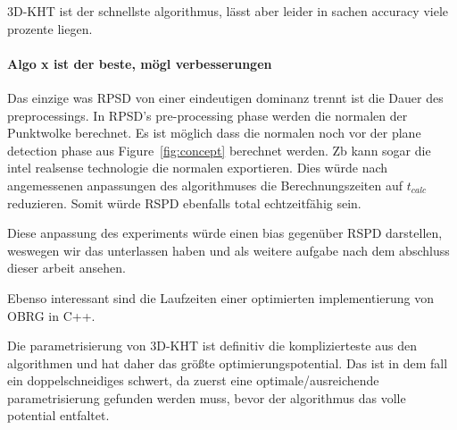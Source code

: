 \documentclass[main.tex]{subfiles}
\begin{document}
3D-KHT ist der schnellste algorithmus, lässt aber leider in sachen accuracy viele prozente liegen.

\paragraph{Algo x ist der beste, mögl verbesserungen}



Das einzige was RPSD von einer eindeutigen dominanz trennt ist die Dauer des preprocessings.
In RPSD's pre-processing phase werden die normalen der Punktwolke berechnet. 
Es ist möglich dass die normalen noch vor der plane detection phase aus Figure~\ref{fig:concept}
berechnet werden. Zb kann sogar die intel realsense technologie die normalen exportieren.
Dies würde nach angemessenen anpassungen des algorithmuses die Berechnungszeiten auf $t_{calc}$
reduzieren. Somit würde RSPD ebenfalls total echtzeitfähig sein. 


Diese anpassung des experiments würde einen bias gegenüber RSPD darstellen, weswegen wir das 
unterlassen haben und als weitere aufgabe nach dem abschluss dieser arbeit ansehen.

Ebenso interessant sind die Laufzeiten einer optimierten implementierung von OBRG in C++.

Die parametrisierung von 3D-KHT ist definitiv die komplizierteste aus den algorithmen und hat daher
das größte optimierungspotential. Das ist in dem fall ein doppelschneidiges schwert, da zuerst eine
optimale/ausreichende parametrisierung gefunden werden muss, bevor der algorithmus das volle potential 
entfaltet. 
\end{document}
